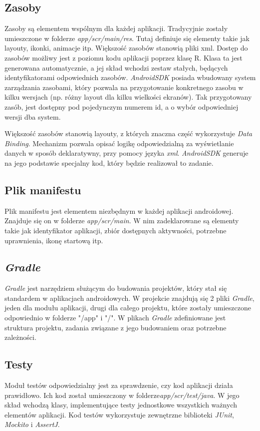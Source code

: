 \documentclass[openright]{xmgr}
\begin{document}
\subsection*{Zasoby}
Zasoby są elementem wspólnym dla każdej aplikacji. Tradycyjnie zostały umieszczone w folderze \textit{app/scr/main/res}. Tutaj definiuje się elementy takie jak layouty, ikonki, animacje itp. Większość zasobów stanowią pliki xml. Dostęp do zasobów możliwy jest z poziomu kodu aplikacji poprzez klasę R. Klasa ta jest generowana automatycznie, a jej skład wchodzi zestaw stałych, będących identyfikatorami odpowiednich zasobów. \textit{AndroidSDK} posiada wbudowany system zarządzania zasobami, który pozwala na przygotowanie konkretnego zasobu w kilku wersjach (np. różny layout dla kilku wielkości ekranów). Tak przygotowany zasób, jest dostępny pod pojedynczym numerem id, a o wybór odpowiedniej wersji dba system.

Większość zasobów stanowią layouty, z których znaczna część wykorzystuje \textit{Data Binding}. Mechanizm pozwala opisać logikę odpowiedzialną za wyświetlanie danych w sposób deklaratywny, przy pomocy języka \textit{xml}. \textit{AndroidSDK} generuje na jego podstawie specjalny kod, który będzie realizował to zadanie. 

\subsection*{Plik manifestu}
Plik manifestu jest elementem niezbędnym w każdej aplikacji androidowej. Znajduje się on w folderze \textit{app/scr/main}. W nim zadeklarowane są elementy takie jak identyfikator aplikacji, zbiór dostępnych aktywności, potrzebne uprawnienia, ikonę startową itp.

\subsection*{\textit{Gradle}}
\textit{Gradle} jest narzędziem służącym do budowania projektów, który stał się standardem w aplikacjach androidowych. W projekcie znajdują się 2 pliki \textit{Gradle}, jeden dla modułu aplikacji, drugi dla całego projektu, które zostały umieszczone odpowiednio w folderze "/app" i "/". W plikach \textit{Gradle} zdefiniowane jest struktura projektu, zadania związane z jego budowaniem oraz potrzebne zależności.

\subsection*{Testy}
Moduł testów odpowiedzialny jest za sprawdzenie, czy kod aplikacji działa prawidłowo. Ich  kod został umieszczony w folderze\textit{app/scr/test/java}. W jego skład wchodzą klasy, implementujące testy jednostkowe wszystkich ważnych elementów aplikacji. Kod testów wykorzystuje zewnętrzne biblioteki \textit{JUnit}, \textit{Mockito} i \textit{AssertJ}.
\end{document}
